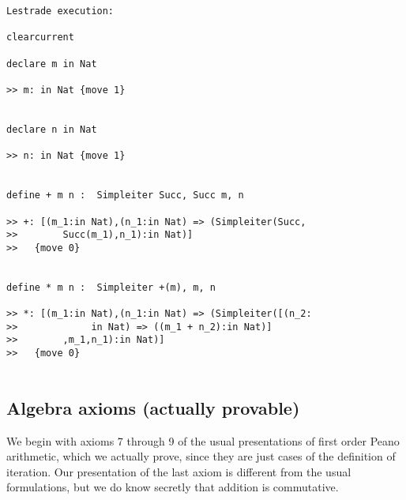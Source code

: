 \documentclass[12pt]{article}
\begin{document}
\begin{verbatim}Lestrade execution:

clearcurrent

declare m in Nat

>> m: in Nat {move 1}


declare n in Nat

>> n: in Nat {move 1}


define + m n :  Simpleiter Succ, Succ m, n

>> +: [(m_1:in Nat),(n_1:in Nat) => (Simpleiter(Succ,
>>        Succ(m_1),n_1):in Nat)]
>>   {move 0}


define * m n :  Simpleiter +(m), m, n

>> *: [(m_1:in Nat),(n_1:in Nat) => (Simpleiter([(n_2:
>>             in Nat) => ((m_1 + n_2):in Nat)]
>>        ,m_1,n_1):in Nat)]
>>   {move 0}


\end{verbatim}


\subsection{Algebra axioms (actually provable)}

We begin with axioms 7 through 9 of the usual presentations of first order Peano arithmetic, which we actually prove, since they are just cases
of the definition of iteration.  Our presentation of the last axiom is different from the usual formulations, but we do know secretly that addition is commutative.
\end{document}
